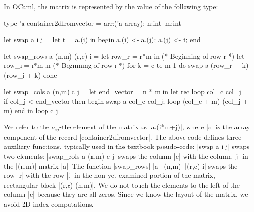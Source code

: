 \documentclass{elsart}
\begin{document}
In OCaml, the matrix is represented by the value of the following type:
\begin{code}
type 'a container2dfromvector = {arr:('a array); n:int; m:int}

let swap a i j =
    let t = a.(i) in begin a.(i) <- a.(j); a.(j) <- t; end

let swap_rows a (n,m) (r,c) i =
  let row_r = r*m in                    (* Beginning of row r *)
  let row_i = i*m in                    (* Beginning of row i *)
  for k = c to m-1 do
      swap a (row_r + k) (row_i + k)
  done

let swap_cols a (n,m) c j =
  let end_vector = n * m in
  let rec loop col_c col_j =
    if col_j < end_vector then
      begin
        swap a col_c col_j;
        loop (col_c + m) (col_j + m)
      end
  in loop c j
\end{code}
We refer to the $a_{ij}$-the element of the matrix as |a.(i*m+j)|,
where |a| is the array component of the record |container2dfromvector|.
The above code defines three auxiliary functions, typically used in the
textbook pseudo-code: |swap a i j| swaps two elements; 
|swap_cols a (n,m) c j| swaps the column |c| with the column |j| in
the |(n,m)|-matrix |a|. The function 
|swap_rows| |a| |(n,m)| |(r,c) i| swaps the row |r| with the row |i| in 
the non-yet examined portion of the matrix, 
rectangular block |(r,c)-(n,m)|. We do not touch the 
elements to the left of the column |c| because they are all zeros. 
Since we know the layout of the matrix, we avoid 2D index
computations.
\end{document}
